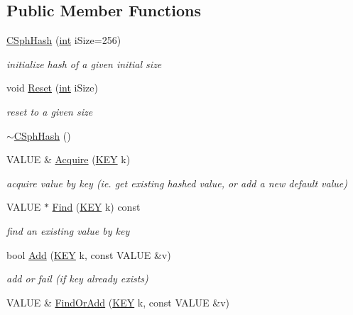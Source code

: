 \subsection*{Public Member Functions}
\begin{DoxyCompactItemize}
\item 
\hyperlink{classCSphHash_ab68baa3209fc4237e4ede722ce2f85e8}{C\-Sph\-Hash} (\hyperlink{sphinxexpr_8cpp_a4a26e8f9cb8b736e0c4cbf4d16de985e}{int} i\-Size=256)
\begin{DoxyCompactList}\small\item\em initialize hash of a given initial size \end{DoxyCompactList}\item 
void \hyperlink{classCSphHash_a22d5a11e1bff9bbc8b6d70e95dcb4884}{Reset} (\hyperlink{sphinxexpr_8cpp_a4a26e8f9cb8b736e0c4cbf4d16de985e}{int} i\-Size)
\begin{DoxyCompactList}\small\item\em reset to a given size \end{DoxyCompactList}\item 
\hyperlink{classCSphHash_adb4385acd181040614673d1b0d3e7547}{$\sim$\-C\-Sph\-Hash} ()
\item 
V\-A\-L\-U\-E \& \hyperlink{classCSphHash_ac1d44d7cd768fa3695870fd3a41ad608}{Acquire} (\hyperlink{classCSphHash_a59a1412d2e0498b2a7417c7adf5d7041}{K\-E\-Y} k)
\begin{DoxyCompactList}\small\item\em acquire value by key (ie. get existing hashed value, or add a new default value) \end{DoxyCompactList}\item 
V\-A\-L\-U\-E $\ast$ \hyperlink{classCSphHash_a13ee702095a92e9d7cdd83ef3b234b4a}{Find} (\hyperlink{classCSphHash_a59a1412d2e0498b2a7417c7adf5d7041}{K\-E\-Y} k) const 
\begin{DoxyCompactList}\small\item\em find an existing value by key \end{DoxyCompactList}\item 
bool \hyperlink{classCSphHash_a07fcd8c037f34b813cddaf287bb74bad}{Add} (\hyperlink{classCSphHash_a59a1412d2e0498b2a7417c7adf5d7041}{K\-E\-Y} k, const V\-A\-L\-U\-E \&v)
\begin{DoxyCompactList}\small\item\em add or fail (if key already exists) \end{DoxyCompactList}\item 
V\-A\-L\-U\-E \& \hyperlink{classCSphHash_ae0e5d34a65eb9193cda30bfafd425a2f}{Find\-Or\-Add} (\hyperlink{classCSphHash_a59a1412d2e0498b2a7417c7adf5d7041}{K\-E\-Y} k, const V\-A\-L\-U\-E \&v)

\end{DoxyCompactItemize}

